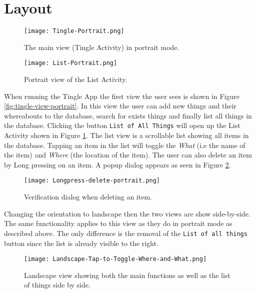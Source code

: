 \section{Layout}

\begin{figure}[!htb]
		\centering
		\texttt{[image: Tingle-Portrait.png]}
		\caption{The main view (Tingle Activity) in portrait mode.}
		\label{fig:tingle-view-portrait}
	\endminipage\hfill
		\centering
		\texttt{[image: List-Portrait.png]}
		\caption{Portrait view of the List Activity.}
		\label{fig:list-view-portrait}
	\endminipage\hfill
\end{figure}

When running the Tingle App the first view the user sees is shown in Figure \ref{fig:tingle-view-portrait}. In this view the user can add new things and their whereabouts to the database, search for exists things and finally list all things in the database. Clicking the button \texttt{List of All Things} will open up the List Activity shown in Figure \ref{fig:list-view-portrait}. The list view is a scrollable list showing all items in the database. Tapping an item in the list will toggle the \emph{What} (i.e the name of the item) and \emph{Where} (the location of the item). The user can also delete an item by Long pressing on an item. A popup dialog appears as seen in Figure \ref{fig:delete-verification-dialog}.

\begin{figure}[H]
	\centering
	\texttt{[image: Longpress-delete-portrait.png]}
	\caption{Verification dialog when deleting an item.}
	\label{fig:delete-verification-dialog}
\end{figure}


Changing the orientation to landscape then the two views are show side-by-side. The same functionality applies to this view as they do in portrait mode as described above. The only difference is the removal of the \texttt{List of all things} button since the list is already visible to the right.

\begin{figure}[H]
	\centering
	\texttt{[image: Landscape-Tap-to-Toggle-Where-and-What.png]}
	\caption{Landscape view showing both the main functions as well as the list of things side by side.}
	\label{fig:landscape-main-view}
\end{figure}

